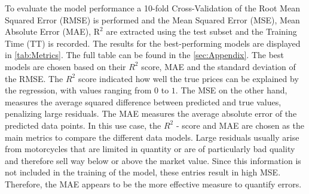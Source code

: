 To evaluate the model performance a 10-fold Cross-Validation of the Root Mean Squared Error (RMSE) is performed and the Mean Squared Error (MSE),
Mean Absolute Error (MAE), $ \mathrm{R}^2 $ are extracted using the test subset and the Training Time (TT) is recorded. The results for the best-performing models
are displayed in \autoref{tab:Metrics}. The full table can be found in the \autoref{sec:Appendix}. The best models are chosen based on their $R^2$ score, MAE and the standard deviation of the RMSE.
The $R^2$ score indicated how well the true prices can be explained by the regression, with values ranging from $0$ to $1$.
The MSE on the other hand, measures the average squared difference between predicted and true values, penalizing large residuals.
The MAE measures the average absolute error of the predicted data points.
In this use case, the $R^2$ - score and MAE are chosen as the main metrics to compare the different data models. Large residuals usually
arise from motorcycles that are limited in quantity or are of particularly bad quality and therefore sell way below or above the market value.
Since this information is not included in the training of the model, these entries result in high MSE. Therefore, the MAE appears to 
be the more effective measure to quantify errors. 
